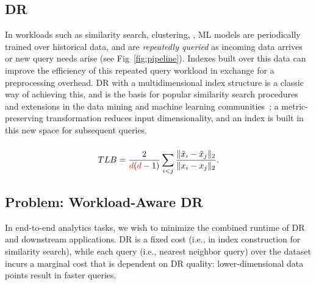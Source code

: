 \subsection{DR }

In workloads such as similarity search, clustering, , ML models are periodically trained over historical data, and are \emph{repeatedly queried} as incoming data arrives or new query needs arise (see Fig~\ref{fig:pipeline}). 
Indexes built over this data can improve the efficiency of this repeated query workload in exchange for a preprocessing overhead.
DR with a multidimensional index structure is a classic way of achieving this, and is the basis for popular similarity search procedures and extensions in the data mining and machine learning communities~\cite{keogh-indexing,local-dr,charu-ss,dynamic-ss,dm-book,humming-index,decade,search}; a metric-preserving transformation reduces input dimensionality, and an index is built in this new space for subsequent queries.


\subsubsection*{}
\begin{equation}
\label{eq:tlb}
TLB = \frac{2}{{\color{red}d}({\color{red}d}-1)}\sum_{i<j}\frac{\| \tilde{x}_i -  \tilde{x}_j \|_2 }{\| x_i -  x_j\|_2 }.
\end{equation}


\subsection{Problem: Workload-Aware DR}
\label{subsec:wadr}

In end-to-end analytics tasks, we wish to minimize the combined runtime of DR and downstream applications. 
DR is a fixed cost (i.e., in index construction for similarity search), while each query (i.e., nearest neighbor query) over the dataset incurs a marginal cost that is dependent on DR quality: lower-dimensional data points result in faster queries. 

